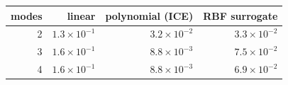\begin{tabular}{rrrr}
\toprule
modes & linear & polynomial (ICE) & RBF surrogate \\
\midrule
2 & $1.3\times10^{-1}$ & $3.2\times10^{-2}$ & $3.3\times10^{-2}$ \\
3 & $1.6\times10^{-1}$ & $8.8\times10^{-3}$ & $7.5\times10^{-2}$ \\
4 & $1.6\times10^{-1}$ & $8.8\times10^{-3}$ & $6.9\times10^{-2}$ \\
\bottomrule
\end{tabular}
